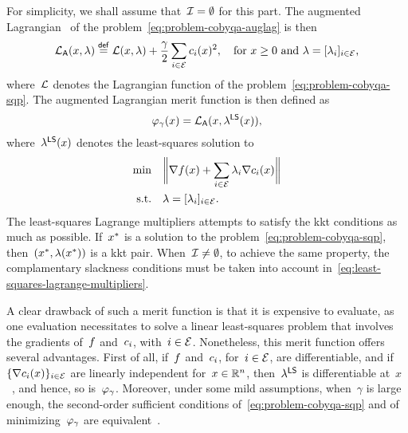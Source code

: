 For simplicity, we shall assume that~$\mathcal{I} = \emptyset$ for this part.
The augmented Lagrangian~\cite{Hestenes_1969,Powell_1969,Rockafellar_1973} of the problem~\cref{eq:problem-cobyqa-auglag} is then
\begin{equation*}
    \auglag(\iter, \lm) \eqdef \lag(\iter, \lm) + \frac{\gamma}{2} \sum_{i \in \ieq} \con{i}(\iter)^2, \quad \text{for~$\iter \ge 0$ and~$\lm = [\lm_i]_{i \in \ieq}$,}
\end{equation*}
where~$\lag$ denotes the Lagrangian function of the problem~\cref{eq:problem-cobyqa-sqp}.
The augmented Lagrangian merit function is then defined as
\begin{equation*}
    \merit_{\gamma}(\iter) = \auglag(\iter, \lm[\mathsf{LS}](\iter)),
\end{equation*}
where~$\lm[\mathsf{LS}](\iter)$ denotes the least-squares solution to
\begin{subequations}
    \label{eq:least-squares-lagrange-multipliers}
    \begin{align}
        \min        & \quad \norm[\bigg]{\nabla \obj(\iter) + \sum_{i \in \ieq} \lm_i \nabla \con{i}(x)}\\
        \text{s.t.} & \quad \lm = [\lm_i]_{i \in \ieq}.
    \end{align}
\end{subequations}
The least-squares Lagrange multipliers attempts to satisfy the \gls{kkt} conditions as much as possible.
If~$\iter[\ast]$ is a solution to the problem~\cref{eq:problem-cobyqa-sqp}, then~$(\iter[\ast], \lm(\iter[\ast]))$ is a \gls{kkt} pair.
When~$\mathcal{I} \neq \emptyset$, to achieve the same property, the complamentary slackness conditions must be taken into account in~\cref{eq:least-squares-lagrange-multipliers}.

A clear drawback of such a merit function is that it is expensive to evaluate, as one evaluation necessitates to solve a linear least-squares problem that involves the gradients of~$f$ and~$c_{i}$, with~$i \in \mathcal{E}$.
Nonetheless, this merit function offers several advantages.
First of all, if~$f$ and~$c_{i}$, for~$i \in \mathcal{E}$, are differentiable, and if~$\set{\nabla \con{i}(\iter)}_{i \in \ieq}$ are linearly independent for~$\iter \in \R^n$, then~$\lm[\mathsf{LS}]$ is differentiable at~$x$~\cite[Lem.~14.2.1]{Conn_Gould_Toint_2000}, and hence, so is~$\merit_{\gamma}$.
Moreover, under some mild assumptions, when~$\gamma$ is large enough, the second-order sufficient conditions of~\cref{eq:problem-cobyqa-sqp} and of minimizing~$\merit_{\gamma}$ are equivalent~\cite[Thm.~14.6.1]{Conn_Gould_Toint_2000}.

